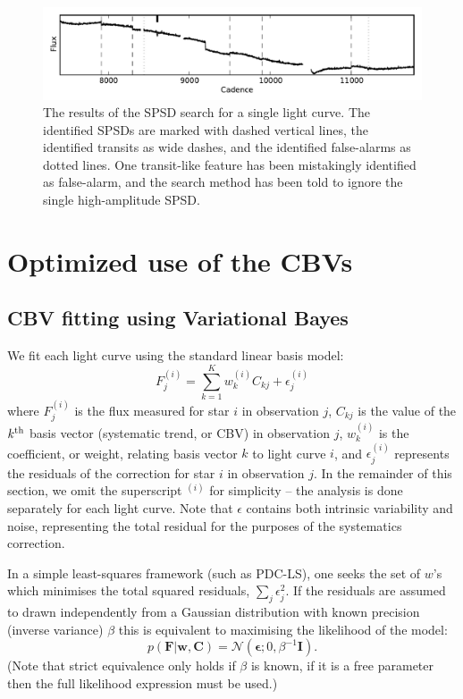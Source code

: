 \documentclass[useAMS,usenatbib]{mn2e}
\begin{document}
\begin{figure}
 \centering
 \includegraphics[width=\textwidth]{jumps_classification.pdf}
 \caption{The results of the SPSD search for a single light curve. The identified SPSDs
  are marked with dashed vertical lines, the identified transits as wide dashes, and the
  identified false-alarms as dotted lines. One transit-like feature has been mistakingly
  identified as false-alarm, and the search method has been told to ignore the single 
  high-amplitude SPSD.}
 \label{fig:jumps_classification}
\end{figure}

\section{Optimized use of the CBVs}
\label{sec:cbv}

\subsection{CBV fitting using Variational Bayes}

We fit each light curve using the standard linear basis model:
\begin{equation}
F^{(i)}_j = \sum_{k=1}^K w^{(i)}_k C_{kj} + \epsilon^{(i)}_j
\end{equation}
where $F^{(i)}_j$ is the flux measured for star $i$ in observation
$j$, $C_{kj}$ is the value of the $k^{\rm th}$ basis vector
(systematic trend, or CBV) in observation $j$, $w^{(i)}_k$ is the
coefficient, or weight, relating basis vector $k$ to light curve $i$,
and $\epsilon^{(i)}_j$ represents the residuals of the correction for
star $i$ in observation $j$. In the remainder of this section, we omit
the superscript $^{(i)}$ for simplicity -- the analysis is done
separately for each light curve. Note that $\epsilon$ contains both
intrinsic variability and noise, representing the total residual for the
purposes of the systematics correction.

In a simple least-squares framework (such as PDC-LS), one seeks the
set of $w$'s which minimises the total squared residuals, $
\sum_j \epsilon_j^2 $. If the residuals are assumed to drawn
independently from a Gaussian distribution with known precision (inverse
variance) $\beta$ this is equivalent to
maximising the likelihood of the model:
\begin{equation}
p(\mathbf{F}|\mathbf{w},\mathbf{C}) =
\mathcal{N}(\boldsymbol{\epsilon};0,\beta^{-1} \mathbf{I}).
\end{equation}
(Note that strict equivalence only holds if $\beta$ is known, if it is
a free parameter then the full likelihood expression must be used.)
\end{document}
